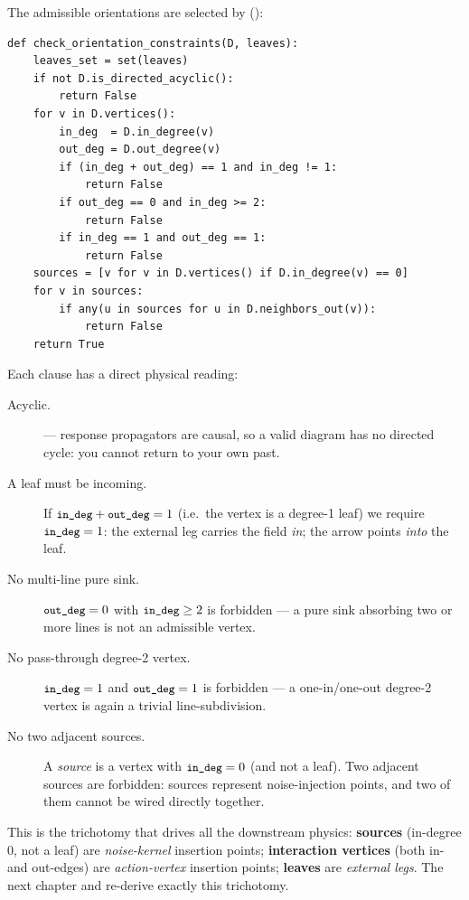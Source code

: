 The admissible orientations are selected by 
():

\begin{lstlisting}
def check_orientation_constraints(D, leaves):
    leaves_set = set(leaves)
    if not D.is_directed_acyclic():
        return False
    for v in D.vertices():
        in_deg  = D.in_degree(v)
        out_deg = D.out_degree(v)
        if (in_deg + out_deg) == 1 and in_deg != 1:
            return False
        if out_deg == 0 and in_deg >= 2:
            return False
        if in_deg == 1 and out_deg == 1:
            return False
    sources = [v for v in D.vertices() if D.in_degree(v) == 0]
    for v in sources:
        if any(u in sources for u in D.neighbors_out(v)):
            return False
    return True
\end{lstlisting}

Each clause has a direct physical reading:

\begin{description}
  \item[Acyclic.]  --- \msrjd{} response
        propagators are causal, so a valid diagram has no directed cycle: you
        cannot return to your own past.
  \item[A leaf must be incoming.] If $\texttt{\small in\_deg}+\texttt{\small out\_deg}=1$ (i.e.\ the
        vertex is a degree-1 leaf) we require $\texttt{\small in\_deg}=1$: the external leg
        carries the field \emph{in}; the arrow points \emph{into} the leaf.
  \item[No multi-line pure sink.] $\texttt{\small out\_deg}=0$ with $\texttt{\small in\_deg}\ge 2$ is
        forbidden --- a pure sink absorbing two or more lines is not an admissible
        \msrjd{} vertex.
  \item[No pass-through degree-2 vertex.] $\texttt{\small in\_deg}=1$ and
        $\texttt{\small out\_deg}=1$ is forbidden --- a one-in/one-out degree-2 vertex is
        again a trivial line-subdivision.
  \item[No two adjacent sources.] A \emph{source} is a vertex with
        $\texttt{\small in\_deg}=0$ (and not a leaf). Two adjacent sources are forbidden:
        sources represent noise-injection points, and two of them cannot be wired
        directly together.
\end{description}

This is the  trichotomy that drives all the
downstream physics: \textbf{sources} (in-degree 0, not a leaf) are
\emph{noise-kernel} insertion points; \textbf{interaction vertices} (both in- and
out-edges) are \emph{action-vertex} insertion points; \textbf{leaves} are
\emph{external legs}. The next chapter and  re-derive
exactly this trichotomy.

